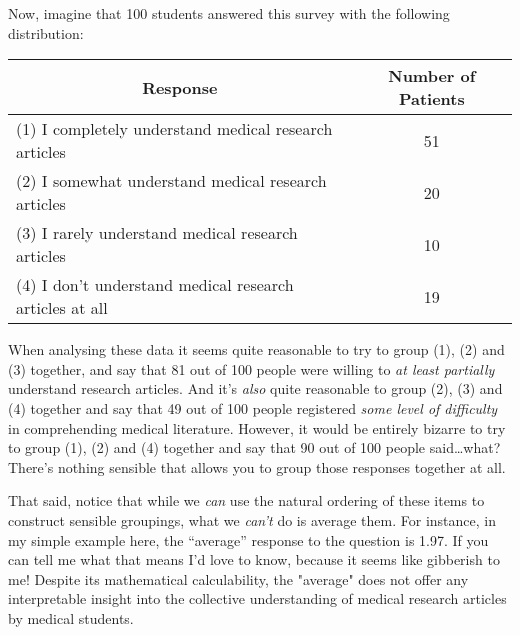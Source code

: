 Now, imagine that 100 students answered this survey with the following distribution:

\vspace*{10pt}
\begin{tabular}{lc}
\multicolumn{1}{c}{Response} & Number of Patients \\ \hline
(1) I completely understand medical research articles & 51 \\
(2) I somewhat understand medical research articles & 20 \\
(3) I rarely understand medical research articles & 10 \\
(4) I don't understand medical research articles at all & 19 \\ \hline
\end{tabular}
\vspace*{10pt}

\noindent
When analysing these data it seems quite reasonable to try to group (1), (2) and (3) together, and say that 81 out of 100 people were willing to {\it at least partially} understand research articles. And it's {\it also} quite reasonable to group (2), (3) and (4) together and say that 49 out of 100 people registered {\it some level of difficulty} in comprehending medical literature. However, it would be entirely bizarre to try to group (1), (2) and (4) together and say that 90 out of 100 people said\ldots what? There's nothing sensible that allows you to group those responses together at all.

That said, notice that while we {\it can} use the natural ordering of these items to construct sensible groupings, what we {\it can't} do is average them. For instance, in my simple example here, the ``average'' response to the question is 1.97. If you can tell me what that means I'd love to know, because it seems like gibberish to me! Despite its mathematical calculability, the "average" does not offer any interpretable insight into the collective understanding of medical research articles by medical students.


